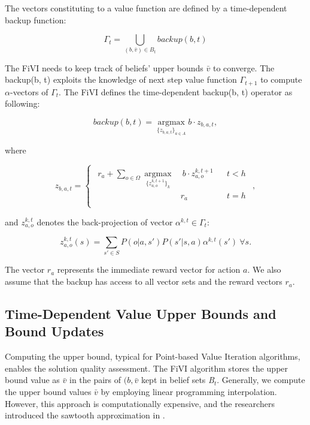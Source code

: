 The vectors constituting to a value function are defined by a time-dependent backup function:

\begin{equation}
    \Gamma_t = \bigcup_{(b, \bar{v}) \in B_t} backup(b, t)
\end{equation}

The FiVI needs to keep track of beliefs' upper bounds $\bar{v}$ to converge. The backup(b, t) exploits the knowledge of next step value function $\Gamma_{t + 1}$ to compute $\alpha$-vectors of $\Gamma_t$. The FiVI defines the time-dependent backup(b, t) operator as following:

\begin{equation} backup(b, t) = \operatorname*{argmax}_{\{z_{b, a, t}\}_{a\in A}} b \cdot z_{b, a, t}, \end{equation}

where 

\begin{equation} z_{b, a, t} = \begin{cases} \begin{aligned}
        r_a + \sum_{o \in \Omega} \operatorname*{argmax}_{\{z^{k, t+1}_{a, o}\}_k}&\ b \cdot z^{k, t+1}_{a, o} && t < h \\
        &r_a && t = h \\
        \end{aligned}\end{cases},\end{equation}

and $z^{k,t}_{a,o}$ denotes the back-projection of vector $\alpha^{k,t} \in \Gamma_t$:

\begin{equation} z^{k,t}_{a,o}(s) = \sum_{s' \in S} P(o|a, s') P(s'| s, a) \alpha^{k, t} (s')\ \forall s.\end{equation}

The vector $r_a$ represents the immediate reward vector for action $a$. We also assume that the backup has access to all vector sets and the reward vectors $r_a$.

\subsection{Time-Dependent Value Upper Bounds and Bound Updates}
Computing the upper bound, typical for Point-based Value Iteration algorithms, enables the solution quality assessment. The FiVI algorithm stores the upper bound value as $\bar{v}$ in the pairs of $(b, \bar{v}$ kept in belief sets \textit{B}$_t$. Generally, we compute the upper bound values $\bar{v}$ by employing linear programming interpolation. However, this approach is computationally expensive, and the researchers introduced the sawtooth approximation in \cite{Hauskrecht_2000}.

